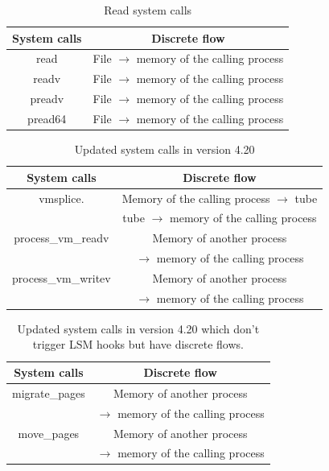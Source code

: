 \begin{table}[ht]
	\caption{Read system calls}
	\centering
	\begin{tabular}{c c}
		\hline\hline 
	System calls & Discrete flow  \\
		\hline
		read & File $\rightarrow$ memory of the calling process \\
			readv & File $\rightarrow$ memory of the calling process \\
				preadv & File $\rightarrow$ memory of the calling process \\
					pread64 & File $\rightarrow$ memory of the calling process \\

	\end{tabular}	
\end{table}


\begin{table}[ht]
	\caption{Updated system calls in version 4.20}
	\centering
	\begin{tabular}{c c}
		\hline\hline 
		System calls & Discrete flow  \\
		\hline
		vmsplice. & Memory of the calling process $\rightarrow$ tube \\
		 & tube $\rightarrow$ memory of the calling process \\
		process\_vm\_readv & Memory of another process  \\
	 & $\rightarrow$ memory of the calling process \\
	 	process\_vm\_writev & Memory of another process  \\
	 & $\rightarrow$ memory of the calling process \\
		
	\end{tabular}	
\end{table}

\begin{table}[ht]
	\caption{Updated system calls in version 4.20 which don't trigger LSM hooks but have discrete flows.}
	\centering
	\begin{tabular}{c c}
		\hline\hline 
		System calls & Discrete flow  \\
		\hline
		migrate\_pages & Memory of another process  \\
		& $\rightarrow$ memory of the calling process \\
		move\_pages & Memory of another process  \\
		& $\rightarrow$ memory of the calling process \\
		
		
	\end{tabular}	
\end{table}

